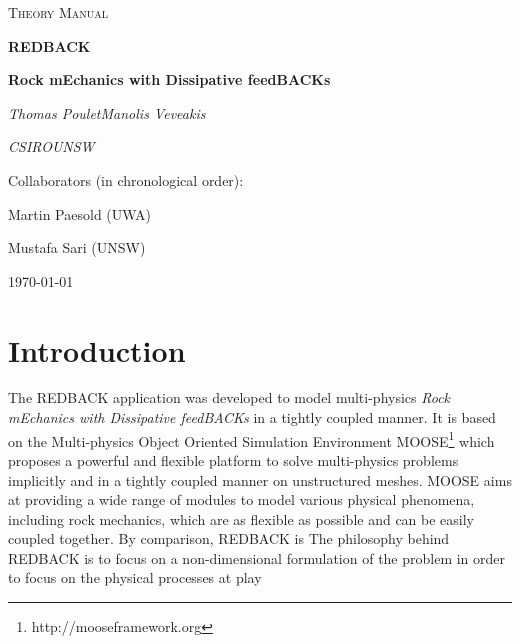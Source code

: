 \documentclass[]{scrreprt}
\newcommand{\moose}{{MOOSE}}
\newcommand{\redback}{{REDBACK}}
\begin{document}
\newif\ifshowallderivations %
\showallderivationstrue

\begin{titlepage}
	\centering
	{\scshape\LARGE Theory Manual \par}
	\vspace{1cm}
	\vspace{1.5cm}
	{\Huge\bfseries \redback{} \par}
	\vspace{0.5cm}
	{\large\bfseries Rock mEchanics with Dissipative feedBACKs\par}
	\vspace{2cm}
	{\Large\itshape Thomas Poulet\hspace{2cm}Manolis Veveakis\par}
	\vspace{0.5cm}
	{\Large\itshape CSIRO\hspace{4cm}UNSW\par}
	\vfill
	Collaborators (in chronological order):\par
	Martin Paesold (UWA) \par
	Mustafa Sari (UNSW)

	\vfill

	{\large \today\par}
\end{titlepage}

%	

\tableofcontents

\chapter{Introduction}

The \redback{} application was developed to model multi-physics \textit{Rock mEchanics with
Dissipative feedBACKs} in a tightly coupled manner. It is based on the Multi-physics Object Oriented Simulation Environment \moose{}\footnote{http://mooseframework.org} \citep{Gaston2009} which proposes a powerful and flexible platform to solve multi-physics problems implicitly and in a tightly coupled manner on unstructured meshes. \moose{} aims at providing a wide range of modules to model various physical phenomena, including rock mechanics, which are as flexible as possible and can be easily coupled together. By comparison, \redback{} is  
The philosophy behind \redback{} is to focus on a non-dimensional formulation of the problem in order to focus on the physical processes at play
\end{document}

